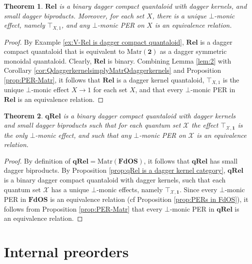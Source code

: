 \documentclass[12pt]{tac}
\newtheorem{theorem}{Theorem}[section]
\theoremstyle{definition}
\theoremstyle{remark}
\newcommand{\X}{\mathcal X}
\newcommand{\<}{\langle}
\renewcommand{\>}{\rangle}
\renewcommand{\:}{\colon}
\begin{document}
\begin{theorem}\label{thm:Rel-properties}
    $\mathbf{Rel}$ is a binary dagger compact quantaloid with dagger kernels, and small dagger biproducts. Moreover, for each set $X$, there is a unique $\bot$-monic effect, namely $\top_{X,1}$, and any $\bot$-monic PER on $X$ is an equivalence relation. 
\end{theorem}
\begin{proof}
By Example \ref{ex:V-Rel is dagger compact quantaloid}, $\mathbf{Rel}$ is a dagger compact quantaloid that is equivalent to $\mathrm{Matr}(\mathbf 2)$ as a dagger symmetric monoidal quantaloid. Clearly, $\mathbf{Rel}$ is binary. Combining   Lemma \ref{lem:2} with Corollary \ref{cor:QdaggerkernelsimplyMatrQdaggerkernels} and Proposition \ref{prop:PER-Matr}, it follows that $\mathbf{Rel}$ is a dagger kernel quantaloid,  $\top_{X,1}$ is the unique $\bot$-monic effect $X\to 1$ for each set $X$, and that every $\bot$-monic PER in $\mathbf{Rel}$ is an equivalence relation.
\end{proof}

\begin{theorem}\label{thm:qRel-properties}
    $\mathbf{qRel}$ is a binary dagger compact quantaloid with dagger kernels and small dagger biproducts such that for each quantum set $\X$ the effect $\top_{\X,\mathbf 1}$ is the only $\bot$-monic effect, and such that any $\bot$-monic PER on $\X$ is an equivalence relation.
\end{theorem}
\begin{proof}
By definition of $\mathbf{qRel}=\mathrm{Matr}(\mathbf{FdOS})$, it follows that $\mathbf{qRel}$ has small dagger biproducts. By Proposition \ref{prop:qRel is a dagger kernel category}, $\mathbf{qRel}$ is a binary dagger compact quantaloid with dagger kernels, such that each quantum set $\X$ has a unique $\bot$-monic effects, namely $\top_{\X,\mathbf 1}$. Since every $\bot$-monic PER in $\mathbf{FdOS}$ is an equivalence relation (cf Proposition \ref{prop:PERs in FdOS}), it follows from  Proposition \ref{prop:PER-Matr} that every $\bot$-monic PER in $\mathbf{qRel}$ is an equivalence relation.
\end{proof}












\section{Internal preorders}\label{sec:internal preorders}
\end{document}
